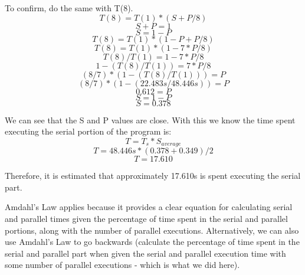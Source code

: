 \documentclass[12pt]{article}
\begin{document}
To confirm, do the same with T(8).
\[ T(8) = T(1) * (S + P/8) \]
\[ S + P = 1 \]
\[ S = 1 - P \]
\[ T(8) = T(1) * (1 - P + P/8) \]
\[ T(8) = T(1) * (1 - 7 * P/8) \]
\[ T(8)/T(1) = 1 - 7 * P/8 \]
\[ 1 - (T(8)/T(1)) = 7 * P/8 \]
\[ (8/7) * (1 - (T(8)/T(1))) = P \]
\[ (8/7) * (1 - (22.483s/48.446s)) = P \]
\[ 0.612 = P \]
\[ S = 1 - P \]
\[ S = 0.378 \]

We can see that the S and P values are close. With this we know the time spent executing the serial portion of the program is:
\[ T = T_s * S_{average} \]
\[ T = 48.446s * (0.378 + 0.349) / 2 \]
\[ T = 17.610 \]

Therefore, it is estimated that approximately 17.610s is spent executing the serial part.

Amdahl's Law applies because it provides a clear equation for calculating serial and parallel times given the percentage of time spent in the serial and parallel portions, along with the number of parallel executions. Alternatively, we can also use Amdahl's Law to go backwards (calculate the percentage of time spent in the serial and parallel part when given the serial and parallel execution time with some number of parallel executions - which is what we did here).
\end{document}
